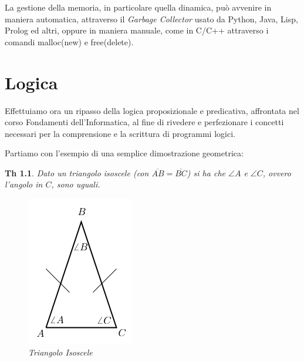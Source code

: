 \documentclass[a4paper]{book}
\newtheorem*{teorema}{Th}
\begin{document}
La gestione della memoria, in particolare quella dinamica, può avvenire in maniera automatica, attraverso il \emph{Garbage Collector}
usato da Python, Java, Lisp, Prolog ed altri, oppure in maniera manuale, come in C/C++ attraverso i comandi malloc(new) e free(delete).
\chapter{Logica}
Effettuiamo ora un ripasso della logica proposizionale e predicativa, affrontata nel corso Fondamenti dell'Informatica, al fine di rivedere
e perfezionare i concetti necessari per la comprensione e la scrittura di programmi logici.

Partiamo con l'esempio di una semplice dimostrazione geometrica:
\begin{teorema}
  Dato un triangolo isoscele (con $\overline{AB}=\overline{BC}$) si ha che $\angle A$ e $\angle C$, ovvero l'angolo in $C$, sono uguali.
\begin{figure}
\caption{Triangolo Isoscele}
\includegraphics[scale=0.5]{img/tri.png}
\end{figure}
\end{teorema}
\end{document}
